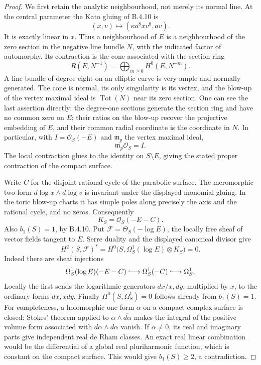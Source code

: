 \begin{proof}
We first retain the analytic neighbourhood, not merely its normal
line.  At the central parameter the Kato gluing of B.4.10 is
\[
 (x,v)\longmapsto(\kappa a^8xv^8,av).
\]
It is exactly linear in $x$.  Thus a neighbourhood of $E$ is a
neighbourhood of the zero section in the negative line bundle
$N$, with the indicated factor of automorphy.
Its contraction is the cone associated with the section ring
\[
 R(E,N^{-1})=\bigoplus_{m\ge0}H^0(E,N^{-m}).
\]
A line bundle of degree eight on an elliptic curve is very ample
and normally generated.  The cone is normal, its only singularity
is its vertex, and the blow-up of the vertex maximal ideal is
$\operatorname{Tot}(N)$ near its zero section.
One can see the last assertion directly: the degree-one sections
generate the section ring and have no common zero on $E$;
their ratios on the blow-up recover the projective embedding of
$E$, and their common radial coordinate is the coordinate in $N$.
In particular, with $I=\mathcal O_S(-E)$ and $\mathfrak m_p$ the
vertex maximal ideal,
\[
 \mathfrak m_p\mathcal O_S=I.
\]
The local contraction glues to the identity on $S\setminus E$,
giving the stated proper contraction of the compact surface.

Write $C$ for the disjoint rational cycle of the parabolic surface.
The meromorphic two-form
$d\log x\wedge d\log v$ is invariant under the displayed
monomial gluing.  In the toric blow-up charts it has simple poles
along precisely the axis and the rational cycle, and no zeros.
Consequently
\[
 K_S=\mathcal O_S(-E-C).
\]
Also $b_1(S)=1$, by B.4.10.
Put $\mathcal F=\Theta_S(-\log E)$, the locally free sheaf of
vector fields tangent to $E$.
Serre duality and the displayed canonical divisor give
\[
 H^2(S,\mathcal F)^*
 =H^0\bigl(S,\Omega^1_S(\log E)\otimes K_S\bigr)=0.
\]
Indeed there are sheaf injections
\[
 \Omega^1_S(\log E)(-E-C)
       \lhook\joinrel\longrightarrow\Omega^1_S(-C)
       \lhook\joinrel\longrightarrow\Omega^1_S.
\]
Locally the first sends the logarithmic generators
$dx/x,dy$, multiplied by $x$, to the ordinary forms $dx,xdy$.
Finally $H^0(S,\Omega^1_S)=0$ follows already from $b_1(S)=1$.
For completeness, a holomorphic one-form $\alpha$ on a compact
complex surface is closed: Stokes' theorem applied to
$\alpha\wedge\overline{d\alpha}$ makes the integral of the
positive volume form associated with
$d\alpha\wedge\overline{d\alpha}$ vanish.
If $\alpha\ne0$, its real and imaginary parts give independent
real de Rham classes.  An exact real linear combination would
be the differential of a global real pluriharmonic function,
which is constant on the compact surface.  This would give
$b_1(S)\ge2$, a contradiction.


\end{proof}

